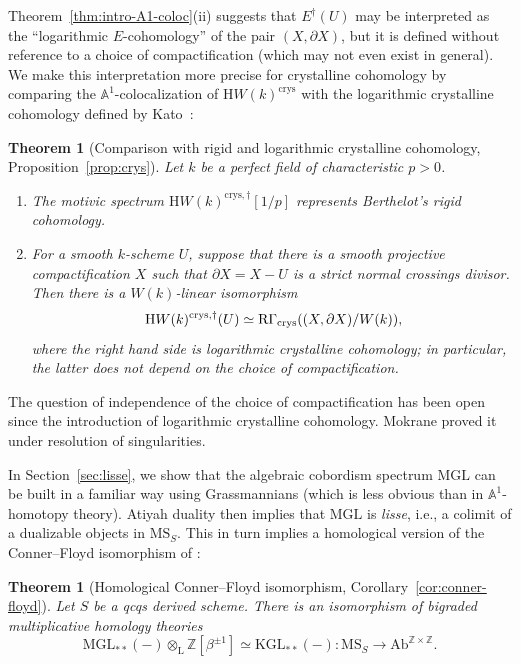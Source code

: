 \documentclass{amsart}
\numberwithin{equation}{section}
\theoremstyle{plain}
\newtheorem{theorem}[equation]{Theorem}
\theoremstyle{definition}
\let\bb=\mathbb
\def\Z{\bb Z}
\def\A{\bb A}
\def\ph{\mathord-}
\def\L{\mathrm{L}{}}
\def\HH{\mathrm{H}}
\def\MGL{\mathrm{MGL}}
\def\KGL{\mathrm{KGL}}
\def\MS{\mathrm{MS}}
\def\setminus{-}
\def\Ab{\mathrm{A}\mathrm{b}}
\newcommand{\crys}{\mathrm{crys}}
\begin{document}
Theorem~\ref{thm:intro-A1-coloc}(ii) suggests that $E^\dagger(U)$ may be interpreted as the ``logarithmic $E$-cohomology'' of the pair $(X,\partial X)$, but it is defined without reference to a choice of compactification (which may not even exist in general). We make this interpretation more precise for crystalline cohomology by comparing the $\A^1$-colocalization of $\HH W(k)^\crys$ with the logarithmic crystalline cohomology defined by Kato~\cite{Kat}:

\begin{theorem}[Comparison with rigid and logarithmic crystalline cohomology, Proposition~\ref{prop:crys}]
	\label{thm:intro-crystalline}
	 Let $k$ be a perfect field of characteristic $p>0$.
	 \begin{enumerate}
	 \item The motivic spectrum $\HH W(k)^{\crys,\dagger}[1/p]$ represents Berthelot's rigid cohomology.
	 \item For a smooth $k$-scheme $U$, suppose that there is a smooth projective compactification $X$ such that $\partial X=X\setminus U$ is a strict normal crossings divisor.
	 Then there is a $W(k)$-linear isomorphism
	 \[
	 	\HH W(k)^{\crys,\dagger}(U) \simeq \mathrm{R}\Gamma_\crys((X,\partial X)/W(k)) \rlap,
	 \]
	 where the right hand side is logarithmic crystalline cohomology; in particular, the latter does not depend on the choice of compactification.
	 \end{enumerate}
\end{theorem}

The question of independence of the choice of compactification has been open since the introduction of logarithmic crystalline cohomology.
Mokrane \cite{Mok} proved it under resolution of singularities.

In Section~\ref{sec:lisse}, we show that the algebraic cobordism spectrum $\MGL$ can be built in a familiar way using Grassmannians (which is less obvious than in $\A^1$-homotopy theory). Atiyah duality then implies that $\MGL$ is \emph{lisse}, i.e., a colimit of a dualizable objects in $\MS_S$. This in turn implies a homological version of the Conner–Floyd isomorphism of \cite{AHI}:

\begin{theorem}[Homological Conner–Floyd isomorphism, Corollary~\ref{cor:conner-floyd}]
	\label{thm:intro-conner-floyd}
	Let $S$ be a qcqs derived scheme. There is an isomorphism of bigraded multiplicative homology theories
	\[
	\MGL_{**}(\ph)\otimes_\L\Z[\beta^{\pm 1}]\simeq \KGL_{**}(\ph)\colon \MS_S\to \Ab^{\Z\times\Z}.
	\]
\end{theorem}
\end{document}
